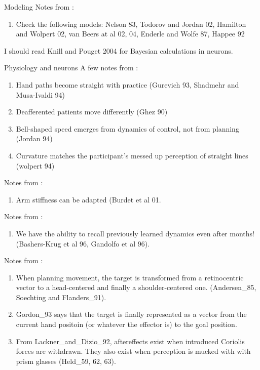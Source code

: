 \documentclass{report}
\begin{document}
\begin{chapter}{Modeling}
Notes from \cite{Harris_Signaldependent_1998}:
\begin{enumerate}
\item Check the following models: Nelson 83, Todorov and Jordan 02, Hamilton and Wolpert 02, van Beers at al 02, 04, Enderle and Wolfe 87, Happee 92
\end{enumerate}

I should read Knill and Pouget 2004 for Bayesian calculations in neurons.

\end{chapter}




\begin{chapter}{Physiology and neurons}
A few notes from \cite{Wolpert_Are_1995}:
\begin{enumerate}
\item Hand paths become straight with practice (Gurevich 93, Shadmehr and Musa-Ivaldi 94)
\item Deafferented patients move differently (Ghez 90)
\item Bell-shaped speed emerges from dynamics of control, not from planning (Jordan 94)
\item Curvature matches the participant's messed up perception of straight lines (wolpert 94)

\end{enumerate}

Notes from \cite{Harris_Signaldependent_1998}:
\begin{enumerate}
\item Arm stiffness can be adapted (Burdet et al 01.
\end{enumerate}

Notes from \cite{Bays_Computational_2007}:
\begin{enumerate}
\item We have the ability to recall previously learned dynamics even after months! (Bashers-Krug et al 96, Gandolfo et al 96).
\end{enumerate}

Notes from \cite{Shadmehr_Adaptive_1994}:
\begin{enumerate}
\item When planning movement, the target is transformed from a retinocentric vector to a head-centered and finally a shoulder-centered one. (Andersen\_85, Soechting and Flanders\_91).
\item Gordon\_93 says that the target is finally represented as a vector from the current hand positoin (or whatever the effector is) to the goal position.
\item From Lackner\_and\_Dizio\_92, aftereffects exist when introduced Coriolis forces are withdrawn. They also exist when perception is mucked with with prism glasses (Held\_59, 62, 63).
\end{enumerate}





\end{chapter}
\end{document}
